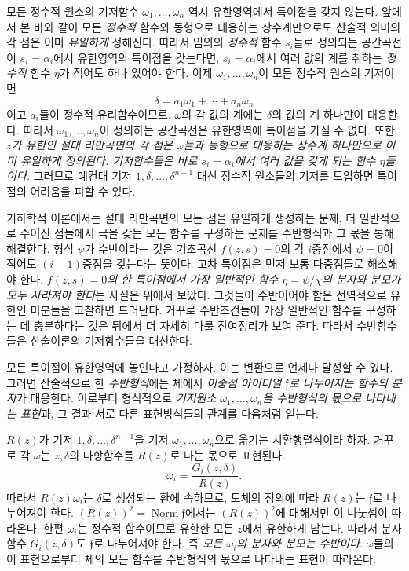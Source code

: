 모든 정수적 원소의 기저함수 \(\omega_1,\ldots,\omega_n\) 역시 유한영역에서 특이점을 갖지 않는다. 앞에서 본 바와 같이 모든 \emph{정수적} 함수와 동형으로 대응하는 상수계만으로도 산술적 의미의 각 점은 이미 \emph{유일하게} 정해진다. 따라서 임의의 \emph{정수적} 함수 \(s_i\)들로 정의되는 \glqq{}공간곡선\grqq{}이 \(s_i=\alpha_i\)에서 유한영역의 특이점을 갖는다면, \(s_i=\alpha_i\)에서 여러 값의 계를 취하는 \emph{정수적} 함수 \(\eta\)가 적어도 하나 있어야 한다. 이제 \(\omega_1,\ldots,\omega_n\)이 모든 정수적 원소의 기저이면
\[
\delta=a_1\omega_1+\cdots+a_n\omega_n
\]
이고 \(a_i\)들이 정수적 유리함수이므로, \(\omega\)의 각 값의 계에는 \(\delta\)의 값의 계 하나만이 대응한다. 따라서 \(\omega_1,\ldots,\omega_n\)이 정의하는 공간곡선은 유한영역에 특이점을 가질 수 없다. 또한 \emph{\(z\)가 유한인 절대 리만곡면의 각 점은 \(\omega\)들과 동형으로 대응하는 상수계 하나만으로 이미 유일하게 정의된다. 기저함수들은 바로 \(s_i=\alpha_i\)에서 여러 값을 갖게 되는 함수 \(\eta\)들이다.} 그러므로 예컨대 기저 \(1,\delta,\ldots,\delta^{n-1}\) 대신 정수적 원소들의 기저를 도입하면 특이점의 어려움을 피할 수 있다.

기하학적 이론에서는 절대 리만곡면의 모든 점을 유일하게 생성하는 문제, 더 일반적으로 주어진 점들에서 극을 갖는 모든 함수를 구성하는 문제를 수반형식과 그 몫을 통해 해결한다. 형식 \(\psi\)가 수반이라는 것은 기초곡선 \(f(z,s)=0\)의 각 \(i\)중점에서 \(\psi=0\)이 적어도 \((i-1)\)중점을 갖는다는 뜻이다. 고차 특이점은 먼저 보통 다중점들로 해소해야 한다. \emph{\(f(z,s)=0\)의 한 특이점에서 가장 일반적인 함수 \(\eta=\psi/\chi\)의 분자와 분모가 모두 사라져야 한다}는 사실은 위에서 보았다. 그것들이 수반이어야 함은 전역적으로 유한인 미분들을 고찰하면 드러난다. 거꾸로 수반조건들이 가장 일반적인 함수를 구성하는 데 충분하다는 것은 뒤에서 더 자세히 다룰 \glqq{}잔여정리\grqq{}가 보여 준다. 따라서 수반함수들은 산술이론의 기저함수들을 대신한다.

모든 특이점이 유한영역에 놓인다고 가정하자. 이는 변환으로 언제나 달성할 수 있다. 그러면 산술적으로 한 \emph{수반형식}에는 체에서 \emph{\glqq{}이중점 아이디얼\grqq{} \(\mathfrak f\)로 나누어지는 함수의 분자}가 대응한다. 이로부터 형식적으로 \emph{기저원소 \(\omega_1,\ldots,\omega_n\)을 수반형식의 몫으로 나타내는 표현}과, 그 결과 서로 다른 표현방식들의 관계를 다음처럼 얻는다.

\(R(z)\)가 기저 \(1,\delta,\ldots,\delta^{n-1}\)을 기저 \(\omega_1,\ldots,\omega_n\)으로 옮기는 치환행렬식이라 하자. 거꾸로 각 \(\omega\)는 \(z,\delta\)의 다항함수를 \(R(z)\)로 나눈 몫으로 표현된다.
\[
\omega_i=\frac{G_i(z,\delta)}{R(z)}.
\]
따라서 \(R(z)\omega_i\)는 \(\delta\)로 생성되는 환에 속하므로, 도체의 정의에 따라 \(R(z)\)는 \(\mathfrak f\)로 나누어져야 한다. \((R(z))^2=\operatorname{Norm}\mathfrak f\)에서는 \((R(z))^2\)에 대해서만 이 나눗셈이 따라온다. 한편 \(\omega_i\)는 정수적 함수이므로 유한한 모든 \(z\)에서 유한하게 남는다. 따라서 분자함수 \(G_i(z,\delta)\)도 \(\mathfrak f\)로 나누어져야 한다. 즉 \emph{모든 \(\omega_i\)의 분자와 분모는 수반이다.} \(\omega\)들의 이 표현으로부터 체의 모든 함수를 수반형식의 몫으로 나타내는 표현이 따라온다.


